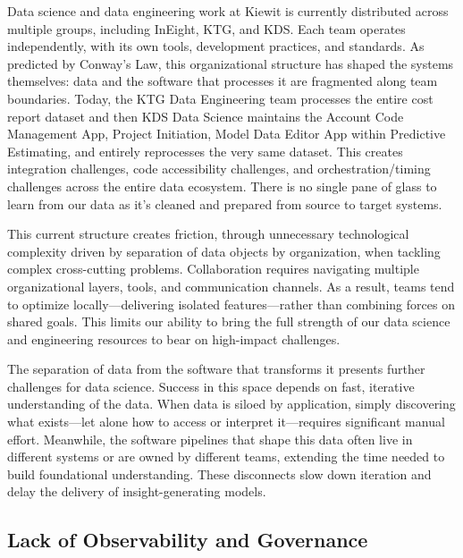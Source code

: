 \documentclass{article}
\begin{document}
Data science and data engineering work at Kiewit is currently distributed across multiple groups, including InEight, KTG, and KDS. Each team operates independently, with its own tools, development practices, and standards. As predicted by Conway’s Law, this organizational structure has shaped the systems themselves: data and the software that processes it are fragmented along team boundaries. Today, the KTG Data Engineering team processes the entire cost report dataset and then KDS Data Science maintains the Account Code Management App, Project Initiation, Model Data Editor App within Predictive Estimating, and entirely reprocesses the very same dataset.  This creates integration challenges, code accessibility challenges, and orchestration/timing challenges across the entire data ecosystem.  There is no single pane of glass to learn from our data as it's cleaned and prepared from source to target systems.

This current structure creates friction, through unnecessary technological complexity driven by separation of data objects by organization, when tackling complex cross-cutting problems. Collaboration requires navigating multiple organizational layers, tools, and communication channels. As a result, teams tend to optimize locally—delivering isolated features—rather than combining forces on shared goals. This limits our ability to bring the full strength of our data science and engineering resources to bear on high-impact challenges.

The separation of data from the software that transforms it presents further challenges for data science. Success in this space depends on fast, iterative understanding of the data. When data is siloed by application, simply discovering what exists—let alone how to access or interpret it—requires significant manual effort. Meanwhile, the software pipelines that shape this data often live in different systems or are owned by different teams, extending the time needed to build foundational understanding. These disconnects slow down iteration and delay the delivery of insight-generating models.

\subsection{Lack of Observability and Governance}
\end{document}

